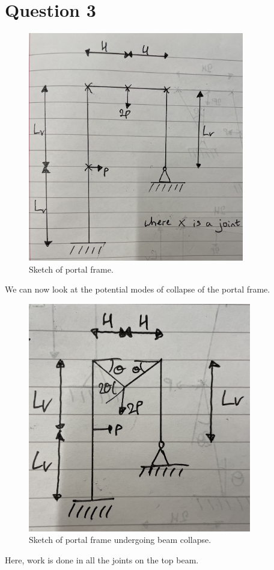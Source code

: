 \documentclass[11pt]{article}
\numberwithin{equation}{section}
\begin{document}
\section{Question 3}
\begin{figure}[H]
    \centering
    \includegraphics[height = 10cm]{./img/q3i1.jpg}
    \caption{Sketch of portal frame.}
\end{figure}
We can now look at the potential modes of collapse of the portal frame. 
\begin{figure}[H]
    \centering
    \includegraphics[height = 10cm]{./img/q3i2.jpg}
    \caption{Sketch of portal frame undergoing beam collapse.}
\end{figure}
Here, work is done in all the joints on the top beam. 
\end{document}
